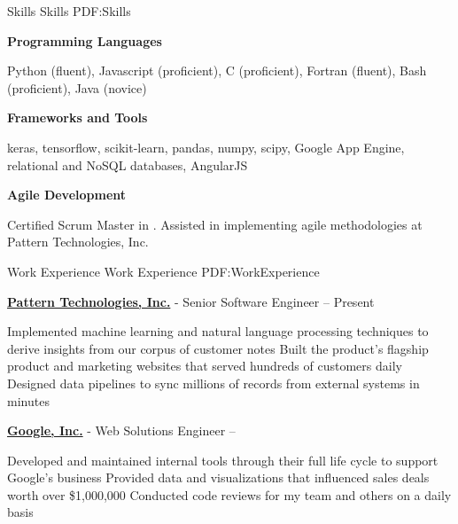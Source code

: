 \documentclass[letterpaper,MMMyyyy,nonstopmode]{simpleresumecv}
\begin{document}
\begin{Body}


\Section
{Skills}
{Skills}
{PDF:Skills}

\Entry
\textbf{Programming Languages}
\begin{Detail}
\Item Python (fluent), Javascript (proficient), C (proficient), Fortran (fluent), Bash (proficient), Java (novice)
\end{Detail}

\BigGap
\Entry
\textbf{Frameworks and Tools}
\begin{Detail}
\Item keras, tensorflow, scikit-learn, pandas, numpy, scipy, Google App Engine, relational and NoSQL databases, AngularJS
\end{Detail}

\BigGap
\Entry
\textbf{Agile Development}
\begin{Detail}
\Item Certified Scrum Master in .  Assisted in implementing agile methodologies at Pattern Technologies, Inc.
\end{Detail}


\Section
{Work Experience}
{Work Experience}
{PDF:WorkExperience}

\Entry
\href {https://getpattern.com}{\textbf{Pattern Technologies, Inc.}}
-
Senior Software Engineer
\hfill
{} -- Present

\Gap
\begin{Detail}
\BulletItem
Implemented machine learning and natural language processing techniques to derive insights from our corpus of customer notes
\BulletItem
Built the product's flagship product and
marketing websites that served hundreds of customers daily
\BulletItem
Designed data pipelines to sync millions of records from external systems in minutes
\end{Detail}


\BigGap
\Entry
\href {https://google.com}{\textbf{Google, Inc.}}
-
Web Solutions Engineer
\hfill
{} -- 

\Gap
\begin{Detail}
\BulletItem
Developed and maintained internal tools through their full life cycle to support Google's business
\BulletItem
Provided data and visualizations that influenced sales deals worth over \$1,000,000
\BulletItem
Conducted code reviews for my team and others on a daily basis
\end{Detail}



\end{Body}
\end{document}
